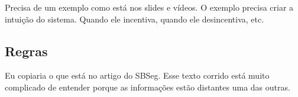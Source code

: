 \documentclass[12pt]{article}
\begin{document}
Precisa de um exemplo como está nos slides e vídeos.
O exemplo precisa criar a intuição do sistema.
Quando ele incentiva, quando ele desincentiva, etc.

\subsection{Regras}

Eu copiaria o que está no artigo do SBSeg.
Esse texto corrido está muito complicado de entender porque as informações estão distantes uma das outras.

\begin{comment}

\subsubsection{Geração} \label{subsubsec:geracao}

Para poder haver qualquer tipo de validação de uma postagem no início do tópico é necessário que o primeiro usuário ao criar o tópico também ganhe reputação e assim consiga postar conteúdo. Logo, a primeira postagem de uma cadeia automaticamente adiciona trinta \emph{reps} ao autor. 

Postar conteúdo também gera \emph{rep}, dessa maneira usuários são recompensados por contribuir no tópico com reputação. Porém para os usuários não abusarem dessa regra e começarem a postar qualquer tipo de de conteúdo indiscriminadamente foi estipulado que somente postagens com pelo menos 24 horas de vida contam como uma reputação positiva, o máximo de reputação que um autor pode obter a partir de postagens é um \emph{rep} por dia. 

Só existem duas maneiras de ganhar reputação em um tópico o que torna unidades de \emph{rep} valiosas. Esta medida incentiva a produção de conteúdo por parte dos usuários, para ganhar mais reputação, mas também incentiva cautela no quanto de reputação deve ser gasto.  

\subsubsection{Consumo} \label{subsubsec:consumo}

Postar mais de um conteúdo em um intervalo menor que 24 horas consume um \emph{rep} do usuário para cada conteúdo extra. Por exemplo, se um usuário posta 3 mensagens em um intervalo de 9 horas ele gasta 2 unidades de \emph{rep}. Essa medida incentiva cada usuários a postar conteúdo de alta qualidade para conseguir \emph{likes} de outros usuários e compensar a reputação gasta.


\end{comment}
\end{document}
